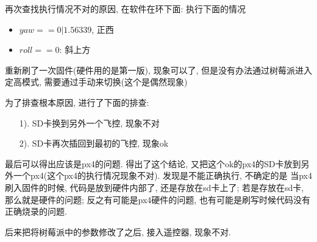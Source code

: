 
  再次查找执行情况不对的原因, 在软件在环下面: 执行下面的情况
  \begin{itemize}
    \item $yaw == 0 | 1.56339$, 正西
    \item $roll == 0$: 斜上方	
  \end{itemize}
  \par 重新刷了一次固件(硬件用的是第一版), 现象可以了, 但是没有办法通过树莓派进入定高模式, 需要通过手动来切换(这个是偶然现象)

  为了排查根本原因, 进行了下面的排查:
  \begin{itemize}
    \item [1).] SD卡换到另外一个飞控, 现象不对
    \item [2).] SD卡再次插回到最初的飞控, 现象ok
  \end{itemize}
  \par 最后可以得出应该是px4的问题. 得出了这个结论, 又把这个ok的px4的SD卡放到另外一个px4(这个px4的执行情况现象不对). 发现是不能正确执行, 不确定的是
  当px4刷入固件的时候, 代码是放到硬件内部了, 还是存放在sd卡上了; 若是存放在sd卡, 那么就是硬件的问题; 反之有可能是px4硬件的问题, 也有可能是刷写时候代码没有正确烧录的问题. 

  \par 后来把将树莓派中的参数修改了之后, 接入遥控器, 现象不对. 
